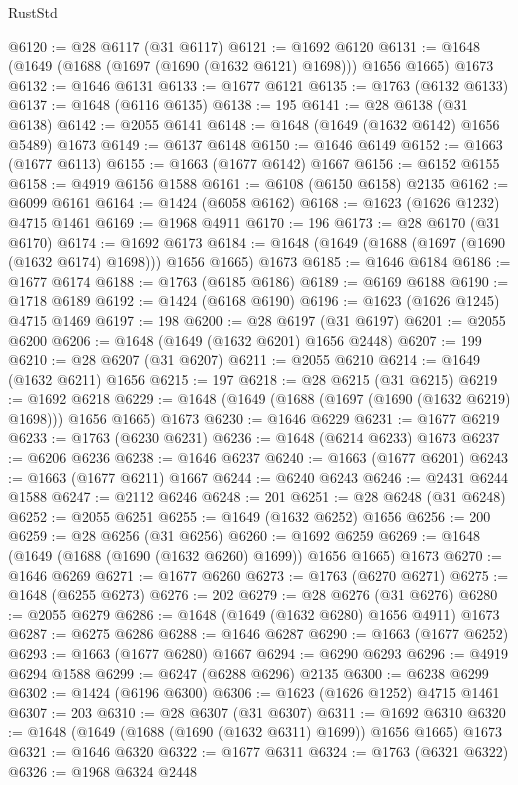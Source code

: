 \begin{lexlean}{RustStd}
\begin{coremodule}
{\begin{coremodule}
{{{{{{{{{{{{{{{{{{{{{{{{{{{{{{{{{{{{{{{{{{{{@6120 := @28 @6117 (@31 @6117)
@6121 := @1692 @6120
@6131 := @1648 (@1649 (@1688 (@1697 (@1690 (@1632 @6121) @1698))) @1656 @1665) @1673
@6132 := @1646 @6131
@6133 := @1677 @6121
@6135 := @1763 (@6132 @6133)
@6137 := @1648 (@6116 @6135)
@6138 := 195
@6141 := @28 @6138 (@31 @6138)
@6142 := @2055 @6141
@6148 := @1648 (@1649 (@1632 @6142) @1656 @5489) @1673
@6149 := @6137 @6148
@6150 := @1646 @6149
@6152 := @1663 (@1677 @6113)
@6155 := @1663 (@1677 @6142) @1667
@6156 := @6152 @6155
@6158 := @4919 @6156 @1588
@6161 := @6108 (@6150 @6158) @2135
@6162 := @6099 @6161
@6164 := @1424 (@6058 @6162)
@6168 := @1623 (@1626 @1232) @4715 @1461
@6169 := @1968 @4911
@6170 := 196
@6173 := @28 @6170 (@31 @6170)
@6174 := @1692 @6173
@6184 := @1648 (@1649 (@1688 (@1697 (@1690 (@1632 @6174) @1698))) @1656 @1665) @1673
@6185 := @1646 @6184
@6186 := @1677 @6174
@6188 := @1763 (@6185 @6186)
@6189 := @6169 @6188
@6190 := @1718 @6189
@6192 := @1424 (@6168 @6190)
@6196 := @1623 (@1626 @1245) @4715 @1469
@6197 := 198
@6200 := @28 @6197 (@31 @6197)
@6201 := @2055 @6200
@6206 := @1648 (@1649 (@1632 @6201) @1656 @2448)
@6207 := 199
@6210 := @28 @6207 (@31 @6207)
@6211 := @2055 @6210
@6214 := @1649 (@1632 @6211) @1656
@6215 := 197
@6218 := @28 @6215 (@31 @6215)
@6219 := @1692 @6218
@6229 := @1648 (@1649 (@1688 (@1697 (@1690 (@1632 @6219) @1698))) @1656 @1665) @1673
@6230 := @1646 @6229
@6231 := @1677 @6219
@6233 := @1763 (@6230 @6231)
@6236 := @1648 (@6214 @6233) @1673
@6237 := @6206 @6236
@6238 := @1646 @6237
@6240 := @1663 (@1677 @6201)
@6243 := @1663 (@1677 @6211) @1667
@6244 := @6240 @6243
@6246 := @2431 @6244 @1588
@6247 := @2112 @6246
@6248 := 201
@6251 := @28 @6248 (@31 @6248)
@6252 := @2055 @6251
@6255 := @1649 (@1632 @6252) @1656
@6256 := 200
@6259 := @28 @6256 (@31 @6256)
@6260 := @1692 @6259
@6269 := @1648 (@1649 (@1688 (@1690 (@1632 @6260) @1699)) @1656 @1665) @1673
@6270 := @1646 @6269
@6271 := @1677 @6260
@6273 := @1763 (@6270 @6271)
@6275 := @1648 (@6255 @6273)
@6276 := 202
@6279 := @28 @6276 (@31 @6276)
@6280 := @2055 @6279
@6286 := @1648 (@1649 (@1632 @6280) @1656 @4911) @1673
@6287 := @6275 @6286
@6288 := @1646 @6287
@6290 := @1663 (@1677 @6252)
@6293 := @1663 (@1677 @6280) @1667
@6294 := @6290 @6293
@6296 := @4919 @6294 @1588
@6299 := @6247 (@6288 @6296) @2135
@6300 := @6238 @6299
@6302 := @1424 (@6196 @6300)
@6306 := @1623 (@1626 @1252) @4715 @1461
@6307 := 203
@6310 := @28 @6307 (@31 @6307)
@6311 := @1692 @6310
@6320 := @1648 (@1649 (@1688 (@1690 (@1632 @6311) @1699)) @1656 @1665) @1673
@6321 := @1646 @6320
@6322 := @1677 @6311
@6324 := @1763 (@6321 @6322)
@6326 := @1968 @6324 @2448
}}}}}}}}}}}}}}}}}}}}}}}}}}}}}}}}}}}}}}}}}}}}
\end{coremodule}}
\end{coremodule}
\end{lexlean}
